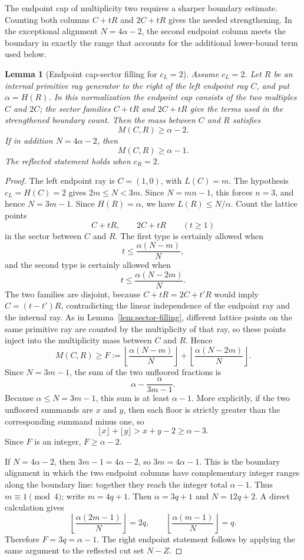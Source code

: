 \documentclass[11pt]{article}
\newtheorem{lemma}[theorem]{Lemma}
\begin{document}
The endpoint cap of multiplicity two requires a sharper boundary estimate.  Counting both columns $C+tR$ and $2C+tR$ gives the needed strengthening.  In the exceptional alignment $N=4\alpha-2$, the second endpoint column meets the boundary in exactly the range that accounts for the additional lower-bound term used below.

\begin{lemma}[Endpoint cap-sector filling for \(c_L=2\)]\label{lem:width-three}
Assume \(c_L=2\).  Let \(R\) be an internal primitive ray generator to the right of the left endpoint ray \(C\), and put \(\alpha=H(R)\).  In this normalization the endpoint cap consists of the two multiples \(C\) and \(2C\); the sector families \(C+tR\) and \(2C+tR\) give the terms used in the strengthened boundary count.  Then the mass between \(C\) and \(R\) satisfies
\[
        M(C,R)\ge \alpha-2.
\]
If in addition \(N=4\alpha-2\), then
\[
        M(C,R)\ge \alpha-1.
\]
The reflected statement holds when \(c_R=2\).
\end{lemma}

\begin{proof}
The left endpoint ray is \(C=(1,0)\), with \(L(C)=m\).  The hypothesis \(c_L=H(C)=2\) gives \(2m\le N<3m\).  Since \(N=mn-1\), this forces \(n=3\), and hence \(N=3m-1\).  Since \(H(R)=\alpha\), we have \(L(R)\le N/\alpha\).  Count the lattice points
\[
        C+tR,
        \qquad
        2C+tR
        \qquad(t\ge1)
\]
in the sector between \(C\) and \(R\).  The first type is certainly allowed when
\[
        t\le\frac{\alpha(N-m)}{N},
\]
and the second type is certainly allowed when
\[
        t\le\frac{\alpha(N-2m)}{N}.
\]
The two families are disjoint, because $C+tR=2C+t'R$ would imply $C=(t-t')R$, contradicting the linear independence of the endpoint ray and the internal ray.  As in Lemma~\ref{lem:sector-filling}, different lattice points on the same primitive ray are counted by the multiplicity of that ray, so these points inject into the multiplicity mass between \(C\) and \(R\).  Hence
\[
M(C,R)
\ge
F:=
\left\lfloor\frac{\alpha(N-m)}{N}\right\rfloor
+
\left\lfloor\frac{\alpha(N-2m)}{N}\right\rfloor.
\]
Since \(N=3m-1\), the sum of the two unfloored fractions is
\[
        \alpha-\frac{\alpha}{3m-1}.
\]
Because \(\alpha\le N=3m-1\), this sum is at least \(\alpha-1\).  More explicitly, if the two unfloored summands are \(x\) and \(y\), then each floor is strictly greater than the corresponding summand minus one, so
\[
        \lfloor x\rfloor+\lfloor y\rfloor>x+y-2\ge \alpha-3.
\]
Since \(F\) is an integer, \(F\ge\alpha-2\).

If \(N=4\alpha-2\), then \(3m-1=4\alpha-2\), so \(3m=4\alpha-1\).  This is the boundary alignment in which the two endpoint columns have complementary integer ranges along the boundary line: together they reach the integer total \(\alpha-1\).  Thus \(m\equiv1\pmod4\); write \(m=4q+1\).  Then \(\alpha=3q+1\) and \(N=12q+2\).  A direct calculation gives
\[
\left\lfloor\frac{\alpha(2m-1)}{N}\right\rfloor=2q,
\qquad
\left\lfloor\frac{\alpha(m-1)}{N}\right\rfloor=q.
\]
Therefore \(F=3q=\alpha-1\).  The right endpoint statement follows by applying the same argument to the reflected cut set \(N-Z\).
\end{proof}
\end{document}

